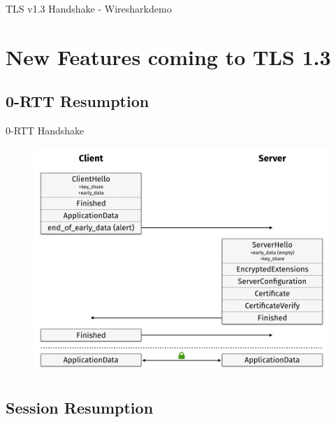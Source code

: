\documentclass{f4_beamer_metropolis}
\begin{document}
\begin{frame}[standout]
  TLS v1.3 Handshake - Wiresharkdemo
\end{frame}

\section{New Features coming to TLS 1.3}

\subsection{0-RTT Resumption}

\begin{frame}{0-RTT Handshake}
  \begin{figure}[!h]
    \centering
    \vspace*{-0.25cm}
    \includegraphics[width=\linewidth]{./images/tls13-handshake-zero-rtt.png}
    \label{fig:tls13-handshake-zero-rtt}
  \end{figure}
\end{frame}

\subsection{Session Resumption}
\end{document}
